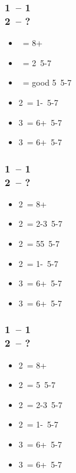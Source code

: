 \documentclass[12pt, a4paper]{article}
\begin{document}
\subsubsection*{1\hearts\ -- 1\spades\ \\ 2\clubs\ -- ?}
\begin{itemize}
    \item \diams\ = 8+
    \item \hearts\ = 2\hearts\ 5-7
    \item \spades\ = good 5\spades\ 5-7
    \item 2\ntx\ = 1-\hearts\ 5-7
    \item 3\clubs\ = 6+\clubs\ 5-7
    \item 3\diams\ = 6+\diams\ 5-7
\end{itemize}

\subsubsection*{1\hearts\ -- 1\ntx\ \\ 2\clubs\ -- ?}
\begin{itemize}
    \item 2\diams\ = 8+
    \item 2\hearts\ = 2-3\hearts\ 5-7
    \item 2\spades\ = 55\minor\ 5-7
    \item 2\nt\ = 1-\hearts\ 5-7
    \item 3\clubs\ = 6+\clubs\ 5-7
    \item 3\diams\ = 6+\diams\ 5-7
\end{itemize}

\subsubsection*{1\spades\ -- 1\ntx\ \\ 2\clubs\ -- ?}
\begin{itemize}
    \item 2\diams\ = 8+
    \item 2\hearts\ = 5\hearts\ 5-7
    \item 2\spades\ = 2-3\spades\ 5-7
    \item 2\ntx\ = 1-\spades\ 5-7
    \item 3\clubs\ = 6+\clubs\ 5-7
    \item 3\diams\ = 6+\diams\ 5-7
\end{itemize}
\end{document}
